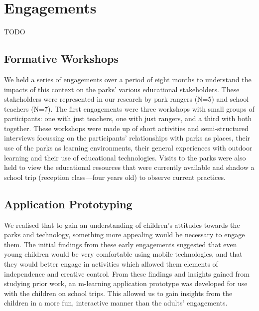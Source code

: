\section{Engagements}

TODO

\subsection{Formative Workshops}

We held a series of engagements over a period of eight months to understand the impacts of this context on the parks’ various educational stakeholders. These stakeholders were represented in our research by park rangers (N=5) and school teachers (N=7). The first engagements were three workshops with small groups of participants: one with just teachers, one with just rangers, and a third with both together. These workshops were made up of short activities and semi-structured interviews focussing on the participants’ relationships with parks as places, their use of the parks as learning environments, their general experiences with outdoor learning and their use of educational technologies. Visits to the parks were also held to view the educational resources that were currently available and shadow a school trip (reception class—four years old) to observe current practices.

\subsection{Application Prototyping}

We realised that to gain an understanding of children’s attitudes towards the parks and technology, something more appealing would be necessary to engage them. The initial findings from these early engagements suggested that even young children would be very comfortable using mobile technologies, and that they would better engage in activities which allowed them elements of independence and creative control. From these findings and insights gained from studying prior work, an m-learning application prototype was developed for use with the children on school trips. This allowed us to gain insights from the children in a more fun, interactive manner than the adults’ engagements.

